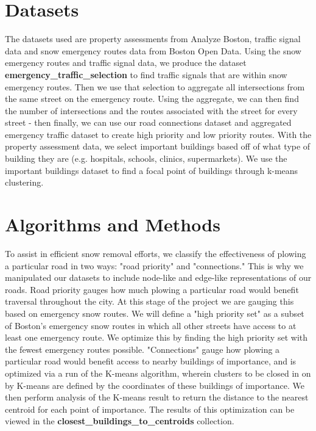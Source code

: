 \documentclass[15pt]{report}
\begin{document}
\section*{Datasets}
The datasets used are property assessments from Analyze Boston, traffic signal data and snow emergency routes data from Boston Open Data. Using the snow emergency routes and traffic signal data, we produce the dataset \textbf{emergency\_traffic\_selection} to find traffic signals that are within snow emergency routes. Then we use that selection to aggregate all intersections from the same street on the emergency route. Using the aggregate, we can then find the number of intersections and the routes associated with the street for every street - then finally, we can use our road connections dataset and aggregated emergency traffic dataset to create high priority and low priority routes. With the property assessment data, we select important buildings based off of what type of building they are (e.g. hospitals, schools, clinics, supermarkets). We use the important buildings dataset to find a focal point of buildings through k-means clustering. 

\section*{Algorithms and Methods}
To assist in efficient snow removal efforts, we classify the effectiveness of plowing a particular road in two ways: "road priority" and "connections." This is why we manipulated our datasets to include node-like and edge-like representations of our roads. Road priority gauges how much plowing a particular road would benefit traversal throughout the city. At this stage of the project we are gauging this based on emergency snow routes. We will define a "high priority set" as a subset of Boston's emergency snow routes in which all other streets have access to at least one emergency route. We optimize this by finding the high priority set with the fewest emergency routes possible. "Connections" gauge how plowing a particular road would benefit access to nearby buildings of importance, and is optimized via a run of the K-means algorithm, wherein clusters to be closed in on by K-means are defined by the coordinates of these buildings of importance. We then perform analysis of the K-means result to return the distance to the nearest centroid for each point of importance. The results of this optimization can be viewed in the \textbf{closest\_buildings\_to\_centroids} collection.
\end{document}
